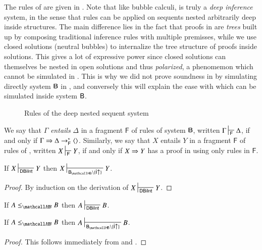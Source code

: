 The rules of  are given in . Note that like
bubble calculi,  is truly a \emph{deep inference} system, in the
sense that rules can be applied on sequents nested arbitrarily deep inside
structures. The main difference lies in the fact that proofs in  are
\emph{trees} built up by composing traditional inference rules with multiple
premisses, while we use closed solutions (neutral bubbles) to internalize the
tree structure of proofs inside solutions. This gives a lot of expressive power
since closed solutions can themselves be nested in open solutions and thus
\emph{polarized}, a phenomemon which cannot be simulated in . This
is why we did not prove soundness in  by simulating
directly system $\sysB$ in , and conversely this will explain the
ease with which  can be simulated inside system $\sysB$.

\begin{figure*}
  
  \caption{Rules of the deep nested sequent system }
\end{figure*}

\begin{definition}
  We say that $\Gamma$ \emph{entails} $\Delta$ in a fragment $\mathsf{F}$ of
  rules of system $\sysB$, written $\Gamma \prov{\mathsf{F}} \Delta$, if and
  only if $\Gamma \Rightarrow \Delta \rightarrow^\ast_{\mathsf{F}} \mathbin{\langle  \rangle}$. Similarly, we say
  that $X$ entails $Y$ in a fragment $\mathsf{F}$ of rules of ,
  written $X \prov{\mathsf{F}} Y$, if and only if $X \Rightarrow Y$ has a proof in
   using only rules in $\mathsf{F}$.
\end{definition}

\begin{lemma} If $X
  \prov{\msys{DBiInt}} Y$ then $X \prov{\sysBHB \setminus
  \{\rsf{i{\uparrow}}\}} Y$.
\end{lemma}
\begin{proof}
  By induction on the derivation of $X \prov{\msys{DBiInt}} Y$.
\end{proof}

\begin{fact}
  If $A \sementHB B$ then $A \prov{\msys{DBiInt}} B$.
\end{fact}

\begin{theorem}
  If $A \sementHB B$ then $A \prov{\sysBHB \setminus \{\rsf{i{\uparrow}}\}} B$.
\end{theorem}
\begin{proof}
  This follows immediately from  and
  .
\end{proof}

